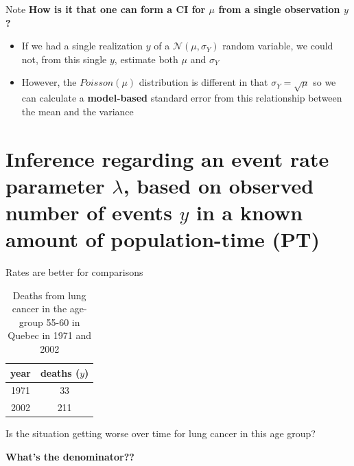 \documentclass[10pt]{beamer}\usepackage[]{graphicx}\usepackage[]{color}
\begin{document}
\begin{frame}{Note}
	\textbf{How is it that one can form a CI for $\mu$ from a single observation $y$?}
	\vspace{0.2in}
	\pause
	\begin{itemize}
		\item If we had a single realization $y$ of a $\mathcal{N}(\mu, \sigma_{Y})$ random variable, we could not,
		from this single $y$, estimate both $\mu$ and $\sigma_{Y}$
		\item However, the $Poisson(\mu)$ distribution is different in that $\sigma_{Y} = \sqrt{\mu}$ so we can calculate a \textbf{model-based} standard error from this relationship between the mean and the variance
	\end{itemize}
	
\end{frame}


\section{Inference regarding an event rate parameter $\lambda$, based on observed number of events $y$ in a known amount of population-time (PT)}

\begin{frame}{Rates are better for comparisons}
	
	
	\begin{table}
		\centering
		\begin{tabular}{cc}
			year & deaths ($y$) \\
			\hline
			1971 & 33 \\
			2002 & 211 \\
			\hline
		\end{tabular}
		\caption{Deaths from lung cancer in the age-group 55-60 in Quebec in 1971 and 2002}
	\end{table} 
	
	\pause 
	
	 Is the situation getting worse over time for lung cancer in this age group?
	\pause
	
	\vspace*{0.5in}
	
	 \textbf{What's the denominator??}
	
	
\end{frame} 



\begin{frame}
\end{frame}
\end{document}
